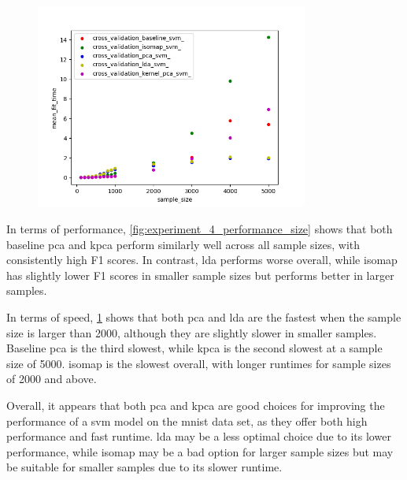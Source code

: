 \begin{figure}[htb!]
    \centering
    \includegraphics[width=0.8\textwidth]{figures/time_based_on_size.png}
    \caption{}
    \label{fig:experiment_4_speed_size}
\end{figure}


In terms of performance, \ref{fig:experiment_4_performance_size} shows that both baseline \gls{pca} and \gls{kpca} perform similarly well across all sample sizes, with consistently high F1 scores. In contrast, \gls{lda} performs worse overall, while \gls{isomap} has slightly lower F1 scores in smaller sample sizes but performs better in larger samples.

In terms of speed, \ref{fig:experiment_4_speed_size} shows that both \gls{pca} and \gls{lda} are the fastest when the sample size is larger than 2000, although they are slightly slower in smaller samples. Baseline \gls{pca} is the third slowest, while \gls{kpca} is the second slowest at a sample size of 5000. \gls{isomap} is the slowest overall, with longer runtimes for sample sizes of 2000 and above.

Overall, it appears that both \gls{pca} and \gls{kpca} are good choices for improving the performance of a \gls{svm} model on the \gls{mnist} data set, as they offer both high performance and fast runtime. \gls{lda} may be a less optimal choice due to its lower performance, while \gls{isomap} may be a bad option for larger sample sizes but may be suitable for smaller samples due to its slower runtime.

